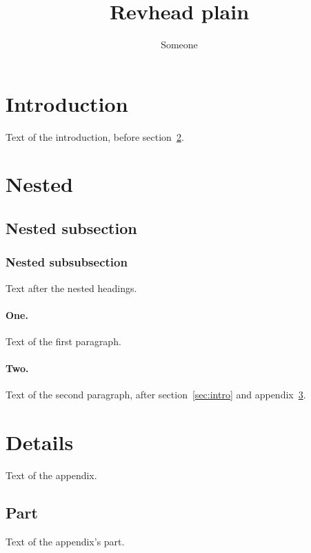\documentclass{revtex4-2}
\begin{document}
\title{Revhead plain}
\author{Someone}
\maketitle
\section{Introduction\label{sec:intro}}
Text of the introduction, before section~\ref{sec:nested}.
\section{Nested}\label{sec:nested}
\subsection{Nested subsection}
\subsubsection{Nested subsubsection}
Text after the nested headings.
\paragraph{One.}
Text of the first paragraph.
\paragraph{Two.}
Text of the second paragraph, after section~\ref{sec:intro} and
appendix~\ref{app:a}.
\appendix
\section{Details}\label{app:a}
Text of the appendix.
\subsection{Part}
Text of the appendix's part.
\end{document}
